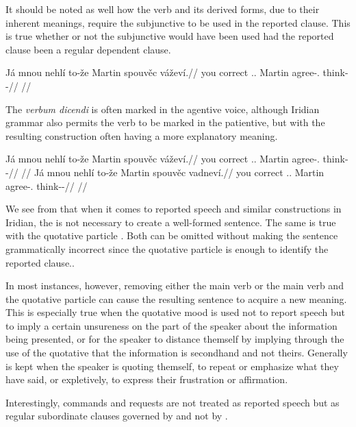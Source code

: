 It should be noted as well how the verb  and its derived
forms, due to their inherent meanings, require the subjunctive to be used in the
reported clause. This is true whether or not the subjunctive would have been
used had the reported clause been a regular dependent clause.

\pex
\begingl
  \gla Já mnou nehlí to-že Martin spouvěc váževí.//
  \glb you correct \Cop{}.\Sbj{}.\Quot{} \Qp{} Martin agree-\Cv{}.\Ipf{} think-\Av{}-\Cont{}//
  \glft {}//
\endgl
\xe

The \emph{verbum dicendi} is often marked in the agentive voice, although
Iridian grammar also permits the verb to be marked in the patientive, but with
the resulting construction often having a more explanatory meaning.

\pex
\a
\begingl
  \gla Já mnou nehlí to-že Martin spouvěc váževí.//
  \glb you correct \Cop{}.\Sbj{}.\Quot{} \Qp{} Martin agree-\Cv{}.\Ipf{} think-\Av{}-\Cont{}//
  \glft {}//
\endgl
\a
\begingl
  \gla Já mnou nehlí to-že Martin spouvěc vadneví.//
  \glb you correct \Cop{}.\Sbj{}.\Quot{} \Qp{} Martin agree-\Cv{}.\Ipf{} think-\Pv{}-\Cont{}//
  \glft {}//
\endgl
\xe

We see from  that when it comes to reported speech and similar constructions in
Iridian, the  is not necessary to
create a well-formed sentence. The same is true with the quotative particle
. Both can be omitted without making the sentence grammatically
incorrect since the quotative particle is enough to identify the reported
clause..

In most instances, however, removing either the main verb or the main verb and
the quotative particle can cause the resulting sentence to acquire a new
meaning. This is especially true when the quotative mood is used not to report
speech but to imply a certain unsureness on the part of the speaker about the
information being presented, or for the speaker to distance themself by implying
through the use of the quotative that the information is secondhand and not
theirs. Generally  is kept when the speaker is quoting themself, to
repeat or emphasize what they have said, or expletively, to express their
frustration or affirmation.

Interestingly, commands and requests are not treated as reported speech but as
regular subordinate clauses governed by  and not by .

